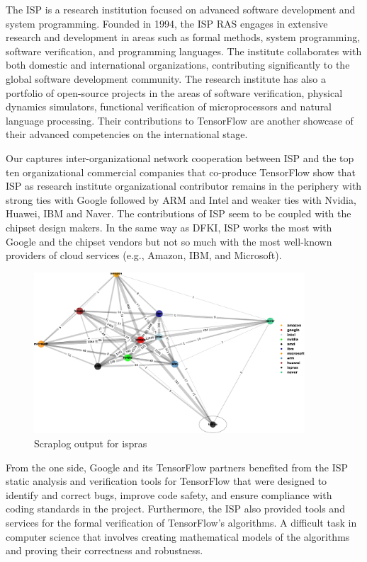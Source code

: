 \documentclass[CHICAGO,Times1COL]{WileyNJDv5} %
\begin{document}
The ISP is a research institution focused on advanced software development and system programming. Founded in 1994, the ISP RAS engages in extensive research and development in areas such as formal methods, system programming, software verification, and programming languages. The institute collaborates with both domestic and international organizations, contributing significantly to the global software development community. The research institute has also a portfolio of open-source projects in the areas of  software verification, physical dynamics simulators, functional verification of microprocessors and natural language processing. Their contributions to TensorFlow are another showcase of their advanced competencies on the international stage. 


Our   captures inter-organizational network cooperation  between 
 ISP and the top ten organizational commercial companies that co-produce TensorFlow show that ISP as research institute organizational contributor remains in the periphery with strong ties with Google followed by ARM and Intel and weaker ties with  Nvidia, Huawei, IBM and Naver.  The contributions of ISP seem to be coupled with the chipset design makers.  In the same way as DFKI, ISP works the most with Google and the chipset vendors but not so much with the most well-known providers of cloud services (e.g., Amazon, IBM, and Microsoft).



\begin{figure}[h]
\centering
\includegraphics[keepaspectratio=true,width=0.9\textwidth]{./Figures/noo/ispras_cropped.pdf}
\caption{Scraplog output for ispras}
\label{figispras}
\end{figure}



From the one side, Google and its TensorFlow partners benefited from the ISP static analysis and verification tools for TensorFlow that were designed to identify and correct bugs, improve code safety, and ensure compliance with coding standards in the project. Furthermore, the ISP also provided tools and services for the formal verification of TensorFlow's algorithms. A difficult task in computer science that involves creating mathematical models of the algorithms and proving their correctness and robustness.
\end{document}
